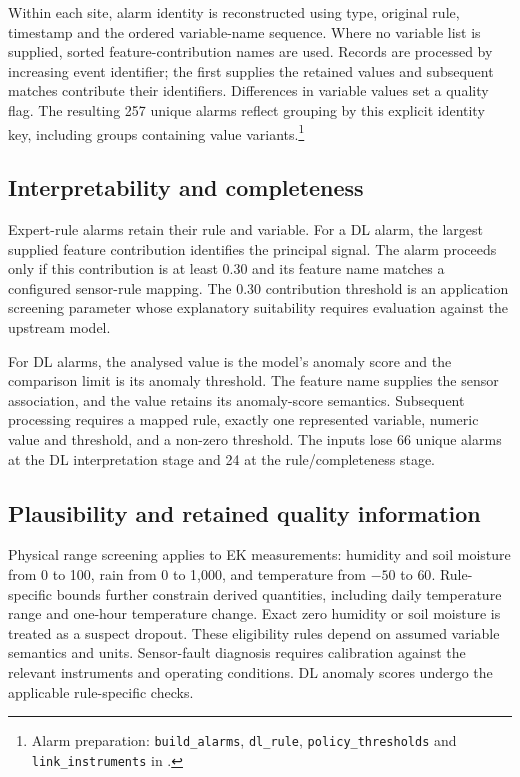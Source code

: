\documentclass[10pt,a4paper]{article}
\begin{document}
Within each site, alarm identity is reconstructed using type, original rule, timestamp and the ordered variable-name sequence. Where no variable list is supplied, sorted feature-contribution names are used. Records are processed by increasing event identifier; the first supplies the retained values and subsequent matches contribute their identifiers. Differences in variable values set a quality flag. The resulting 257 unique alarms reflect grouping by this explicit identity key, including groups containing value variants.\footnote{Alarm preparation: \texttt{build\_alarms}, \texttt{dl\_rule}, \texttt{policy\_thresholds} and \texttt{link\_instruments} in .}

\subsection{Interpretability and completeness}
Expert-rule alarms retain their rule and variable. For a DL alarm, the largest supplied feature contribution identifies the principal signal. The alarm proceeds only if this contribution is at least 0.30 and its feature name matches a configured sensor-rule mapping. The 0.30 contribution threshold is an application screening parameter whose explanatory suitability requires evaluation against the upstream model.

For DL alarms, the analysed value is the model's anomaly score and the comparison limit is its anomaly threshold. The feature name supplies the sensor association, and the value retains its anomaly-score semantics. Subsequent processing requires a mapped rule, exactly one represented variable, numeric value and threshold, and a non-zero threshold. The inputs lose 66 unique alarms at the DL interpretation stage and 24 at the rule/completeness stage.

\subsection{Plausibility and retained quality information}
Physical range screening applies to EK measurements: humidity and soil moisture from 0 to 100, rain from 0 to 1,000, and temperature from $-50$ to $60$. Rule-specific bounds further constrain derived quantities, including daily temperature range and one-hour temperature change. Exact zero humidity or soil moisture is treated as a suspect dropout. These eligibility rules depend on assumed variable semantics and units. Sensor-fault diagnosis requires calibration against the relevant instruments and operating conditions. DL anomaly scores undergo the applicable rule-specific checks.
\end{document}
